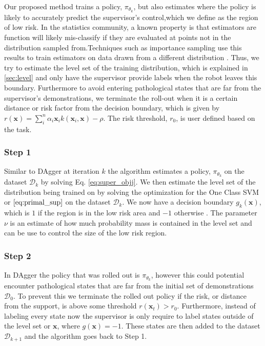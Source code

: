 \documentclass[10pt, conference]{ieeeconf}      %
\newcommand{\bx}{\mathbf{x}}
\begin{document}
Our proposed method trains a policy, $\pi_{\theta_k}$, but also estimates where the policy is likely to accurately predict the supervisor's control,which we define as the region of low risk.  In the statistics community, a known property is that estimators are function will likely mis-classify if they are evaluated at points not in the distribution sampled from.Techniques such as importance sampling use this results to train estimators on data drawn from a different distribution \cite{tokdar2010importance}.  Thus, we try to estimate the level set of the training distribution, which is explained in \ref{sec:level} and only have the supervisor provide labels when the robot leaves this boundary. Furthermore to avoid entering pathological states that are far from the supervisor's demonstrations, we terminate the roll-out when it is a certain distance or risk factor from the decision boundary, which is given by $r(\bx) = \sum_i^n \alpha_i \bx_i k(\bx_i,\bx)-\rho$. The risk threshold, $r_0$, is user defined based on the task. 

\subsubsection{Step 1}
Similar to DAgger at iteration $k$ the algorithm estimates a policy, $\pi_{\theta_k}$ on the dataset $\mathcal{D}_k$ by solving Eq. \ref{eq:super_objj}. We then estimate the level set of the distribution being trained on by solving the optimization for the One Class SVM or $\ref{eq:primal_sup}$ on the dataset $\mathcal{D}_k$. We now have a decision boundary $g_k(\bx)$, which is $1$ if the region is in the low risk area and $-1$ otherwise . The parameter $\nu$ is an estimate of how much probability mass is contained in the level set and can be use to control the size of the low risk region. 
 
 
 \subsubsection{Step 2}
 In DAgger the policy that was rolled out is $\pi_{\theta_k}$, however this could potential encounter pathological states that are far from the initial set of demonstrations $\mathcal{D}_0$. To prevent this we terminate the rolled out policy if the risk, or distance from the support, is above some threshold $r(\bx_t) > r_0$.  Furthermore, instead of labeling every state now the supervisor is only require to label states outside of the level set or $\bx$, where $g(\bx) = -1$.  These states are then added to the dataset $\mathcal{D}_{k+1}$ and the algorithm goes back to Step 1. 
\end{document}
